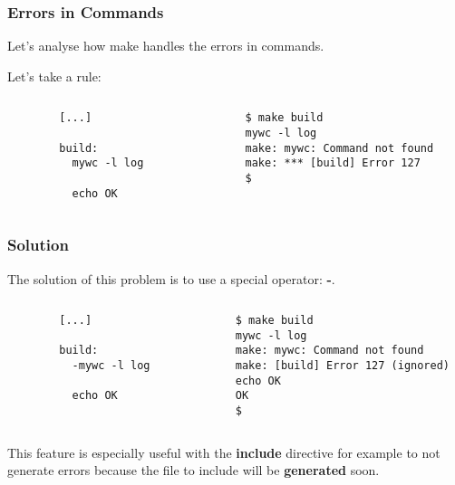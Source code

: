 \begin{frame}[containsverbatim]
  \frametitle{Errors in Commands}

  Let's analyse how make handles the errors in commands.

  \nl

  Let's take a rule:

  \begin{columns}

    \begin{column}{6cm}
      \begin{verbatim}
        [...]

        build:
          mywc -l log

          echo OK
      \end{verbatim}
    \end{column}

    \begin{column}{6cm}
      \begin{verbatim}
        $ make build
        mywc -l log
        make: mywc: Command not found
        make: *** [build] Error 127
        $ 
      \end{verbatim}
    \end{column}

  \end{columns}
\end{frame}


\begin{frame}[containsverbatim]
  \frametitle{Solution}

  The solution of this problem is to use a special operator: \textbf{-}.

  \begin{columns}

    \begin{column}{6cm}
      \begin{verbatim}
        [...]

        build:
          -mywc -l log

          echo OK
      \end{verbatim}
    \end{column}

    \begin{column}{6cm}
      \begin{verbatim}
        $ make build
        mywc -l log
        make: mywc: Command not found
        make: [build] Error 127 (ignored)
        echo OK
        OK
        $ 
      \end{verbatim}
    \end{column}

  \end{columns}

  \nl

  This feature is especially useful with the \textbf{include} directive
  for example to not generate errors because the file to include will
  be \textbf{generated} soon.
\end{frame}

